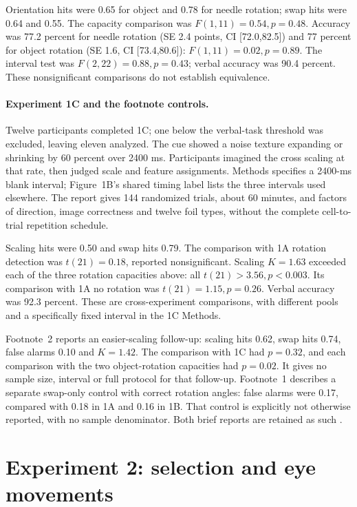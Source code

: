 Orientation hits were 0.65 for object and 0.78 for needle
rotation; swap hits were 0.64 and 0.55.
The capacity comparison was \(F(1,11)=0.54,p=0.48\).
Accuracy was 77.2 percent for needle rotation
(SE 2.4 points, CI [72.0,82.5]) and 77 percent for object
rotation (SE 1.6, CI [73.4,80.6]):
\(F(1,11)=0.02,p=0.89\).
The interval test was \(F(2,22)=0.88,p=0.43\);
verbal accuracy was 90.4 percent. These nonsignificant
comparisons do not establish equivalence.

\paragraph{Experiment 1C and the footnote controls.}
Twelve participants completed 1C; one below the verbal-task
threshold was excluded, leaving eleven analyzed.
The cue showed a noise texture expanding or shrinking by
60 percent over 2400 ms. Participants imagined the cross
scaling at that rate, then judged scale and feature assignments.
Methods specifies a 2400-ms blank interval; Figure~1B's shared
timing label lists the three intervals used elsewhere.
The report gives 144 randomized trials, about 60 minutes,
and factors of direction, image correctness and twelve foil
types, without the complete cell-to-trial repetition schedule.

Scaling hits were 0.50 and swap hits 0.79.
The comparison with 1A rotation detection was
\(t(21)=0.18\), reported nonsignificant.
Scaling \(K=1.63\) exceeded each of the three rotation
capacities above: all \(t(21)>3.56,p<0.003\).
Its comparison with 1A no rotation was \(t(21)=1.15,p=0.26\).
Verbal accuracy was 92.3 percent.
These are cross-experiment comparisons, with different pools
and a specifically fixed interval in the 1C Methods.

Footnote~2 reports an easier-scaling follow-up: scaling hits
0.62, swap hits 0.74, false alarms 0.10 and \(K=1.42\).
The comparison with 1C had \(p=0.32\), and each comparison
with the two object-rotation capacities had \(p=0.02\).
It gives no sample size, interval or full protocol for that
follow-up. Footnote~1 describes a separate swap-only control
with correct rotation angles: false alarms were 0.17,
compared with 0.18 in 1A and 0.16 in 1B.
That control is explicitly not otherwise reported, with no
sample denominator. Both brief reports are retained as such
\cite[Experiments~1A--1C; notes~1--2; Fig.~1]{XuFranconeri2015FeatureCapacity}.

\section{Experiment 2: selection and eye movements}
\label{sec:p19-rotation-eye-movements}

